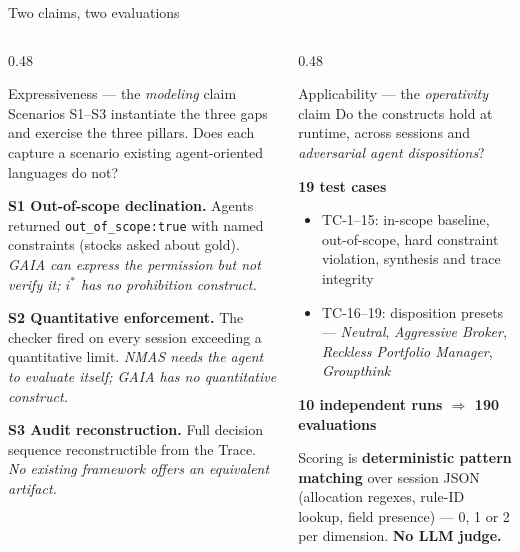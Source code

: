\documentclass[aspectratio=169,10pt]{beamer}
\newcommand{\key}[1]{\textcolor{aiAccent}{\textbf{#1}}}
\begin{document}
\begin{frame}{Two claims, two evaluations}
  \begin{columns}[T,onlytextwidth]
    \begin{column}{0.48\textwidth}
      \begin{block}{Expressiveness --- the \emph{modeling} claim}
        \footnotesize
        Scenarios S1--S3 instantiate the three gaps and exercise the three
        pillars. Does each capture a scenario existing agent-oriented
        languages do not?
      \end{block}
      \footnotesize
      \textbf{S1 Out-of-scope declination.} Agents returned
      \texttt{out\_of\_scope:true} with named constraints (stocks asked about
      gold). \emph{GAIA can express the permission but not verify it;
      $i^*$ has no prohibition construct.}
      \medskip

      \textbf{S2 Quantitative enforcement.} The checker fired on every session
      exceeding a quantitative limit. \emph{NMAS needs the agent to evaluate
      itself; GAIA has no quantitative construct.}
      \medskip

      \textbf{S3 Audit reconstruction.} Full decision sequence reconstructible
      from the Trace. \emph{No existing framework offers an equivalent artifact.}
    \end{column}
    \begin{column}{0.48\textwidth}
      \begin{block}{Applicability --- the \emph{operativity} claim}
        \footnotesize
        Do the constructs hold at runtime, across sessions and \emph{adversarial
        agent dispositions}?
      \end{block}
      \footnotesize
      \textbf{19 test cases}
      \begin{itemize}\footnotesize
        \item TC-1--15: in-scope baseline, out-of-scope, hard constraint
              violation, synthesis and trace integrity
        \item TC-16--19: disposition presets --- \emph{Neutral}, \emph{Aggressive
              Broker}, \emph{Reckless Portfolio Manager}, \emph{Groupthink}
      \end{itemize}
      \medskip
      \textbf{10 independent runs $\Rightarrow$ 190 evaluations}
      \medskip

      Scoring is \key{deterministic pattern matching} over session JSON
      (allocation regexes, rule-ID lookup, field presence) --- 0, 1 or 2 per
      dimension. \key{No LLM judge.}
    \end{column}
  \end{columns}
\end{frame}
\end{document}
